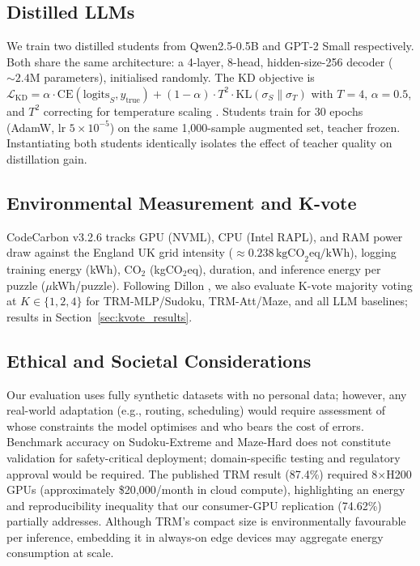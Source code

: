 \documentclass{article}
\begin{document}
\subsection{Distilled LLMs}
\label{sec:distilled_llms}

We train two distilled students from Qwen2.5-0.5B and GPT-2 Small respectively. Both share the same architecture: a 4-layer, 8-head, hidden-size-256 decoder (${\sim}2.4$M parameters), initialised randomly. The KD objective is $\mathcal{L}_\text{KD} = \alpha\cdot\text{CE}(\text{logits}_S,y_\text{true}) + (1-\alpha)\cdot T^2\cdot\text{KL}(\sigma_S\|\sigma_T)$ with $T=4$, $\alpha=0.5$, and $T^2$ correcting for temperature scaling \cite{Hinton2015}. Students train for 30 epochs (AdamW, lr $5\times10^{-5}$) on the same 1{,}000-sample augmented set, teacher frozen. Instantiating both students identically isolates the effect of teacher quality on distillation gain.

\subsection{Environmental Measurement and K-vote}
\label{sec:kvote}

CodeCarbon v3.2.6 \cite{Courty2023} tracks GPU (NVML), CPU (Intel RAPL), and RAM power draw against the England UK grid intensity (${\approx}0.238\,\text{kgCO}_2\text{eq/kWh}$), logging training energy (kWh), CO$_2$ (kgCO$_2$eq), duration, and inference energy per puzzle ($\mu$kWh/puzzle). Following Dillon , we also evaluate K-vote majority voting at $K\in\{1,2,4\}$ for TRM-MLP/Sudoku, TRM-Att/Maze, and all LLM baselines; results in Section~\ref{sec:kvote_results}.

\subsection{Ethical and Societal Considerations}

Our evaluation uses fully synthetic datasets with no personal data; however, any real-world adaptation (e.g., routing, scheduling) would require assessment of whose constraints the model optimises and who bears the cost of errors. Benchmark accuracy on Sudoku-Extreme and Maze-Hard does not constitute validation for safety-critical deployment; domain-specific testing and regulatory approval would be required. The published TRM result (87.4\%) required 8$\times$H200 GPUs (approximately \$20{,}000/month in cloud compute), highlighting an energy and reproducibility inequality that our consumer-GPU replication (74.62\%) partially addresses. Although TRM's compact size is environmentally favourable per inference, embedding it in always-on edge devices may aggregate energy consumption at scale.
\end{document}
